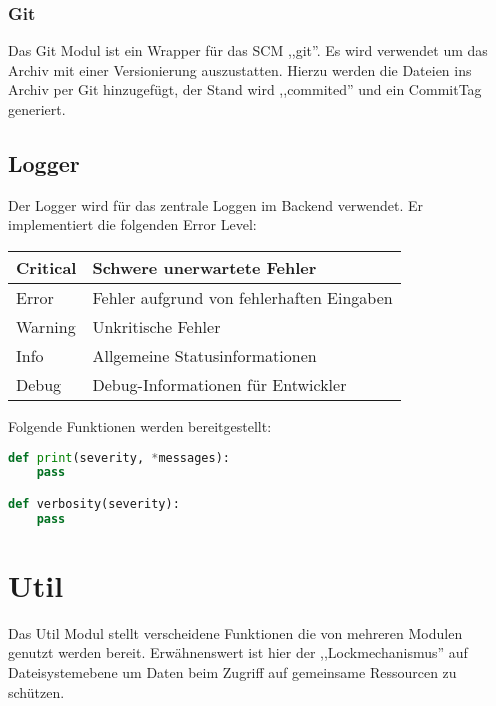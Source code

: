 \subsubsection{Git}
\label{ssub:git}
Das Git Modul ist ein Wrapper für das SCM ,,git''. Es wird verwendet um das Archiv mit einer Versionierung auszustatten. Hierzu werden 
die Dateien ins Archiv per Git hinzugefügt, der Stand wird ,,commited'' und ein CommitTag generiert.

\subsection{Logger}
\label{sub:logger}
Der Logger wird für das zentrale Loggen im Backend verwendet. Er implementiert die folgenden Error Level:

\begin{table}[h]
\centering
\begin{tabular}{|l|l|}
    \hline
    Critical & Schwere unerwartete Fehler \\
    \hline
    Error & Fehler aufgrund von fehlerhaften Eingaben \\
    \hline
    Warning & Unkritische Fehler \\
    \hline
    Info & Allgemeine Statusinformationen \\
    \hline
    Debug & Debug-Informationen für Entwickler \\
    \hline
\end{tabular} 
\end{table}

Folgende Funktionen werden bereitgestellt:
\begin{lstlisting}[language=python]
def print(severity, *messages):
    pass

def verbosity(severity):
    pass
\end{lstlisting}

\section{Util} 
\label{sec:util}
Das Util Modul stellt verscheidene Funktionen die von mehreren Modulen genutzt werden bereit. Erwähnenswert ist hier der ,,Lockmechanismus''
auf Dateisystemebene um Daten beim Zugriff auf gemeinsame  Ressourcen zu schützen.


